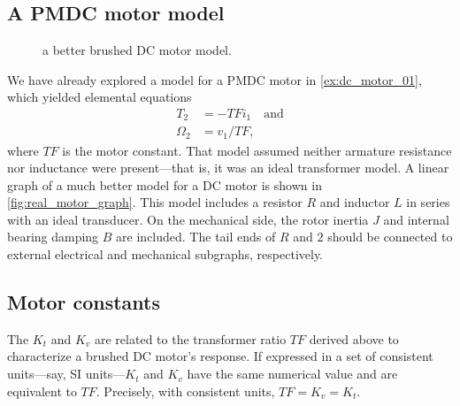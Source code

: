 \documentclass[dynamic_systems.tex]{subfiles}
\begin{document}
\subsection{A PMDC motor model}
\tags{}

\begin{wrapfigure}[10]{r}{0.4\textwidth}
  \centering
  \caption{\label{fig:real_motor_graph} a better brushed DC motor model.}%
\end{wrapfigure}

We have already explored a model for a PMDC motor in \autoref{ex:dc_motor_01}, which yielded elemental equations 
\begin{align}
	T_2 &= -TF i_1 \quad\text{and}\\
	\Omega_2 &= v_1/TF,
\end{align}
where $TF$ is the motor constant.
That model assumed neither armature resistance nor inductance were present---that is, it was an ideal transformer model.
A linear graph of a much better model for a DC motor is shown in \autoref{fig:real_motor_graph}.
This model includes a resistor $R$ and inductor $L$ in series with an ideal transducer.
On the mechanical side, the rotor inertia $J$ and internal bearing damping $B$ are included.
The tail ends of $R$ and $2$ should be connected to external electrical and mechanical subgraphs, respectively. 

\subsection{Motor constants}
\tags{}

The  $K_t$ and  $K_v$ are related to the transformer ratio $TF$ derived above to characterize a brushed DC motor's response.
If expressed in a set of consistent units---say, SI units---$K_t$ and $K_v$ have the same numerical value and are equivalent to $TF$.
Precisely, with consistent units, $TF = K_v = K_t$.
\end{document}

